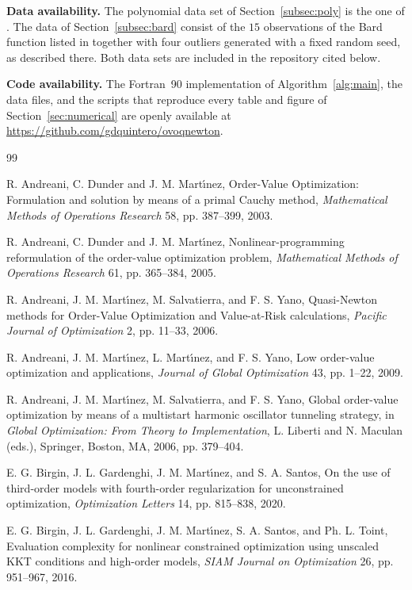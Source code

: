 \documentclass[11pt]{article}
\newcounter{alg}[section]
\begin{document}
\medskip
\noindent\textbf{Data availability.} The polynomial data set of
Section~\ref{subsec:poly} is the one of \cite{dunder1}. The data of
Section~\ref{subsec:bard} consist of the $15$ observations of the Bard function
listed in \cite{mgh} together with four outliers generated with a fixed random
seed, as described there. Both data sets are included in the repository cited
below.

\medskip
\noindent\textbf{Code availability.} The Fortran~90 implementation of
Algorithm~\ref{alg:main}, the data files, and the scripts that reproduce every
table and figure of Section~\ref{sec:numerical} are openly available at
\url{https://github.com/gdquintero/ovoqnewton}.

\clearpage

\begin{thebibliography}{99}

 R. Andreani, C. Dunder and J. M. Mart\'{\i}nez, Order-Value Optimization: Formulation and solution by means of a primal Cauchy method, \textit{Mathematical Methods of Operations Research} 58, pp. 387--399, 2003.

 R. Andreani, C. Dunder and J. M. Mart\'{\i}nez, Nonlinear-programming reformulation of the order-value optimization problem, \textit{Mathematical Methods of Operations Research} 61, pp. 365--384, 2005.

 R. Andreani, J. M. Mart\'{\i}nez, M. Salvatierra, and F. S. Yano, Quasi-Newton methods for Order-Value Optimization and Value-at-Risk calculations, \textit{Pacific Journal of Optimization} 2, pp. 11--33, 2006.

 R. Andreani, J. M. Mart\'{\i}nez, L. Mart\'{\i}nez, and F. S. Yano, Low order-value optimization and applications, \textit{Journal of Global Optimization} 43, pp. 1--22, 2009.

 R. Andreani, J. M. Mart\'{\i}nez, M. Salvatierra, and F. S. Yano, Global order-value optimization by means of a multistart harmonic oscillator tunneling strategy, in \textit{Global Optimization: From Theory to Implementation}, L. Liberti and N. Maculan (eds.), Springer, Boston, MA, 2006, pp. 379--404.

 E. G. Birgin, J. L. Gardenghi, J. M. Mart\'{\i}nez, and S. A. Santos, On the use of third-order models with fourth-order regularization for unconstrained optimization, \textit{Optimization Letters} 14, pp. 815--838, 2020.

 E. G. Birgin, J. L. Gardenghi, J. M. Mart\'{\i}nez, S. A. Santos, and Ph. L. Toint, Evaluation complexity for nonlinear constrained optimization using unscaled KKT conditions and high-order models, \textit{SIAM Journal on Optimization} 26, pp. 951--967, 2016.


\end{thebibliography}
\end{document}
